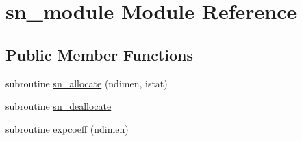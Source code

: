 \hypertarget{classsn__module}{\section{sn\-\_\-module Module Reference}
\label{classsn__module}
}
\subsection*{Public Member Functions}
\begin{DoxyCompactItemize}
\item 
subroutine \hyperlink{classsn__module_a96e40577460722f9d6459532754ffec8}{sn\-\_\-allocate} (ndimen, istat)
\item 
subroutine \hyperlink{classsn__module_a522dde8b096fdc16b8f06026903ee695}{sn\-\_\-deallocate}
\item 
subroutine \hyperlink{classsn__module_ae84f22a96d1692e168f816ee1709ee47}{expcoeff} (ndimen)
\end{DoxyCompactItemize}
